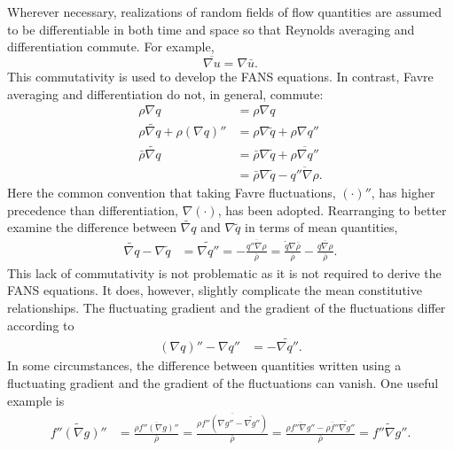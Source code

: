 Wherever necessary, realizations of random fields of flow quantities
are assumed to be differentiable in both time and space so that Reynolds
averaging and differentiation commute.  For example,
%
\begin{equation}
\overline{ \nabla{}u } = \nabla\bar{u}.
\end{equation}
%
This commutativity is used to develop the FANS equations.  In contrast, Favre
averaging and differentiation do not, in general, commute:
\begin{align*}
  \rho \nabla q &= \rho \nabla q
\\
   \rho \widetilde{\nabla{}q} + \rho \left(\nabla{}q\right)''
&=
   \rho \nabla \tilde{q} + \rho \nabla{}q''
\\
     \bar{\rho} \widetilde{\nabla{}q}
&=
     \bar{\rho} \nabla{\tilde{q}}
   + \overline{\rho \nabla{}q''}
\\
&=
     \bar{\rho} \nabla{\tilde{q}}
   - \overline{q''\nabla\rho}.
\end{align*}
Here the common convention that taking Favre fluctuations,
$\left(\cdot\right)''$, has higher precedence than differentiation,
$\nabla\left(\cdot\right)$, has been adopted.  Rearranging to better examine
the difference between $\widetilde{\nabla{}q}$ and $\nabla\tilde{q}$ in terms
of mean quantities,
\begin{align}
  \label{eq:favremeancommute}
  \widetilde{\nabla{}q}
  -
  \nabla{\tilde{q}}
&=
  \widetilde{\nabla{}q''}
= - \frac{{\overline{q''\nabla\rho}}}{\bar{\rho}}
= \frac{\tilde{q}\nabla\bar{\rho}}{\bar{\rho}}
  - \frac{\overline{q\nabla\rho}}{\bar{\rho}}
.
\end{align}
This lack of commutativity is not problematic as it is not required to derive the
FANS equations.  It does, however, slightly complicate the mean constitutive
relationships.  The fluctuating gradient and the gradient of the fluctuations
differ according to
\begin{align}
  \label{eq:favrefluctcommute}
  \left(\nabla{}q\right)'' - \nabla{}q'' &= - \widetilde{\nabla{}q''}
.
\end{align}
In some circumstances, the difference between quantities written using a
fluctuating gradient and the gradient of the fluctuations can vanish.
One useful example is
\begin{align}
  \label{eq:favrefluctexample}
\widetilde{f''\left(\nabla{}g\right)''}
&=
\frac{\overline{\rho{}f''\left(\nabla{}g\right)''}}
     {\bar{\rho}}
=
\frac{  \overline{\rho{}f''\left(\nabla{}g''
      - \widetilde{\nabla{}g''}\right)}}
     {\bar{\rho}}
=
\frac{  \overline{\rho{}f''\nabla{}g''}
      - \overline{\rho{}f''}\widetilde{\nabla{}g''}}
     {\bar{\rho}}
=
\widetilde{f''\nabla{}g''}
.
\end{align}

